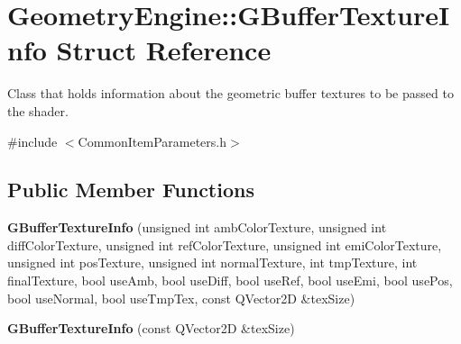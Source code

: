 \hypertarget{struct_geometry_engine_1_1_g_buffer_texture_info}{}\section{Geometry\+Engine\+::G\+Buffer\+Texture\+Info Struct Reference}
\label{struct_geometry_engine_1_1_g_buffer_texture_info}


Class that holds information about the geometric buffer textures to be passed to the shader.  




{\ttfamily \#include $<$Common\+Item\+Parameters.\+h$>$}

\subsection*{Public Member Functions}
\begin{DoxyCompactItemize}
\item 
\mbox{\label{struct_geometry_engine_1_1_g_buffer_texture_info_afbf90d9af515ea582a09e8378c65d5c3}} 
{\bfseries G\+Buffer\+Texture\+Info} (unsigned int amb\+Color\+Texture, unsigned int diff\+Color\+Texture, unsigned int ref\+Color\+Texture, unsigned int emi\+Color\+Texture, unsigned int pos\+Texture, unsigned int normal\+Texture, int tmp\+Texture, int final\+Texture, bool use\+Amb, bool use\+Diff, bool use\+Ref, bool use\+Emi, bool use\+Pos, bool use\+Normal, bool use\+Tmp\+Tex, const Q\+Vector2D \&tex\+Size)
\item 
\mbox{\label{struct_geometry_engine_1_1_g_buffer_texture_info_a813289a200b77f99e997e4fd74da9a73}} 
{\bfseries G\+Buffer\+Texture\+Info} (const Q\+Vector2D \&tex\+Size)
\end{DoxyCompactItemize}
